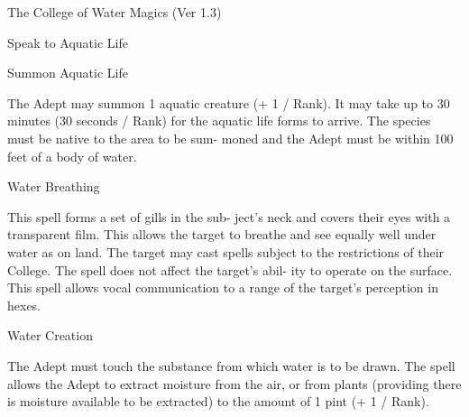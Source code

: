 \begin{Chapter}{The College of Water Magics (Ver 1.3)}
\begin{spell}[G-9]{Speak to Aquatic Life }
\begin{effects}
\end{effects}
\end{spell}

\begin{spell}[G-10]{Summon Aquatic Life }

\begin{effects}
The Adept may summon 1 aquatic creature 
(+  1  /  Rank).  It  may  take  up  to  30  minutes  (30 
seconds / Rank) for the aquatic life forms to arrive. 
The  species  must  be  native  to  the  area  to  be  sum-
moned and the Adept must be within 100 feet of a 
body of water. 

\end{effects}
\end{spell}

\begin{spell}[G-11]{Water Breathing }

\begin{effects}
 This  spell  forms  a  set  of  gills  in  the  sub-
ject’s neck and covers their eyes with a transparent 
film.  This  allows  the  target  to  breathe  and  see 
equally  well  under  water  as  on  land.  The  target 
may  cast  spells  subject  to  the  restrictions  of  their 
College. The spell does not affect the target’s abil-
ity  to  operate  on  the  surface.  This  spell  allows 
vocal  communication  to  a  range  of  the  target’s 
perception in hexes. 

\end{effects}
\end{spell}

\begin{spell}[G-12]{Water Creation }

\begin{effects}
 The  Adept  must  touch  the  substance  from 
which  water  is  to  be  drawn.  The  spell  allows  the 
Adept  to  extract  moisture  from  the  air,  or  from 
plants  (providing  there  is  moisture  available  to  be 
extracted) to the amount of 1 pint (+ 1 / Rank). 

\end{effects}
\end{spell}


\end{Chapter}
